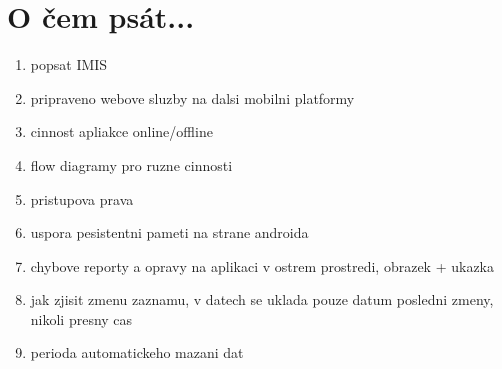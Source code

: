 \documentclass{bakalarka}
\begin{document}
\section{O čem psát...}
\begin{enumerate}
\item popsat IMIS 
\item pripraveno webove sluzby na dalsi mobilni platformy
\item cinnost apliakce online/offline
\item flow diagramy pro ruzne cinnosti
\item pristupova prava
\item uspora pesistentni pameti na strane androida
\item chybove reporty a opravy na aplikaci v ostrem prostredi, obrazek + ukazka
\item jak zjisit zmenu zaznamu, v datech se uklada pouze datum posledni zmeny, nikoli presny cas
\item perioda automatickeho mazani dat
\end{enumerate}

\appendix

%
\end{document}
